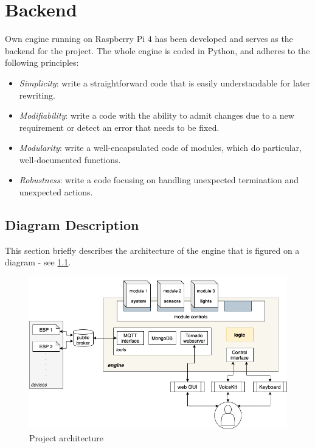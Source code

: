 \chapter{Backend} \label{chap:backend}



Own engine running on Raspberry Pi 4 has been developed and serves as the backend for the project. The whole engine is coded in Python, and adheres to the following principles:
\begin{itemize}
	\item \textit{Simplicity}: write a straightforward code that is easily understandable for later rewriting.
	\item \textit{Modifiability}: write a code with the ability to admit changes due to a new requirement or detect an error that needs to be fixed.
	\item \textit{Modularity}: write a well-encapsulated code of modules, which do particular, well-documented functions.
	\item \textit{Robustness}: write a code focusing on handling unexpected termination and unexpected actions.
\end{itemize}


\section{Diagram Description} \label{section:diagram description}

This section briefly describes the architecture of the engine that is figured on a diagram - see  \cref{fig:vh_project_design}.

\begin{figure}[H]
  \centering
  \includegraphics[width=\textwidth]{img/vh_project_design.png}
  \caption{Project architecture}
  \label{fig:vh_project_design}
\end{figure}

